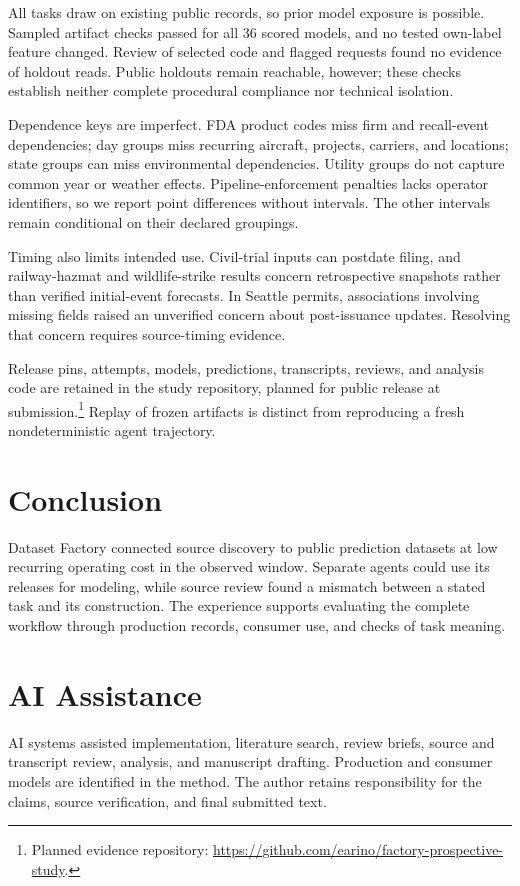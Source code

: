 \documentclass[conference,10pt,letterpaper]{IEEEtran}
\begin{document}
All tasks draw on existing public records, so prior model exposure is possible. Sampled artifact checks passed for all 36 scored models, and no tested own-label feature changed. Review of selected code and flagged requests found no evidence of holdout reads. Public holdouts remain reachable, however; these checks establish neither complete procedural compliance nor technical isolation.

Dependence keys are imperfect. FDA product codes miss firm and recall-event dependencies; day groups miss recurring aircraft, projects, carriers, and locations; state groups can miss environmental dependencies. Utility groups do not capture common year or weather effects. Pipeline-enforcement penalties lacks operator identifiers, so we report point differences without intervals. The other intervals remain conditional on their declared groupings.

Timing also limits intended use. Civil-trial inputs can postdate filing, and railway-hazmat and wildlife-strike results concern retrospective snapshots rather than verified initial-event forecasts. In Seattle permits, associations involving missing fields raised an unverified concern about post-issuance updates. Resolving that concern requires source-timing evidence.

Release pins, attempts, models, predictions, transcripts, reviews, and analysis code are retained in the study repository, planned for public release at submission.\footnote{Planned evidence repository: \url{https://github.com/earino/factory-prospective-study}.} Replay of frozen artifacts is distinct from reproducing a fresh nondeterministic agent trajectory.

\section{Conclusion}
Dataset Factory connected source discovery to public prediction datasets at low recurring operating cost in the observed window. Separate agents could use its releases for modeling, while source review found a mismatch between a stated task and its construction. The experience supports evaluating the complete workflow through production records, consumer use, and checks of task meaning.

\section*{AI Assistance}
AI systems assisted implementation, literature search, review briefs, source and transcript review, analysis, and manuscript drafting. Production and consumer models are identified in the method. The author retains responsibility for the claims, source verification, and final submitted text.



\end{document}
